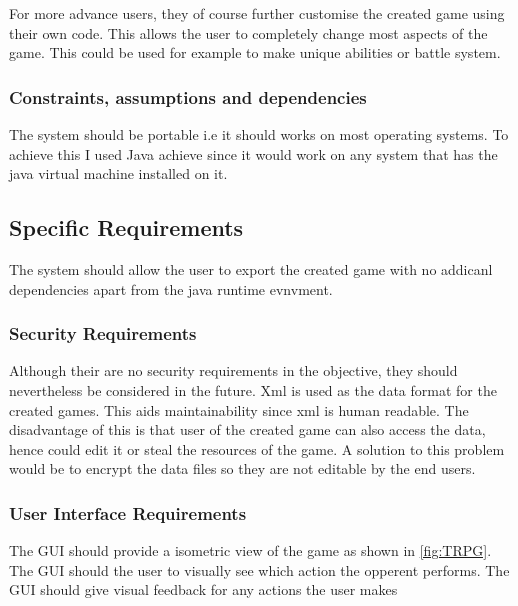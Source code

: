 For more advance users, they of course further customise the created game using their own code. This allows the user to completely change most aspects of the game. This could be used for example to make unique abilities or battle system.


\subsubsection{Constraints, assumptions and dependencies}
The system should be portable i.e it should works on most operating systems.  To achieve this I used Java achieve since it would work on any system that has the java virtual machine installed on it. 



\subsection{Specific Requirements}
The system should allow the user to export the created game with no addicanl dependencies apart from the java runtime evnvment. 

\subsubsection{Security Requirements}
Although their are no security requirements in the objective, they should nevertheless  be considered in the future. Xml is used as the data format for the created games. This aids maintainability since xml is human readable. The disadvantage of this is that user of the created game can also access the data, hence could edit it or steal the resources of the game. A solution to this problem would be to encrypt the data files so they are not editable by the end users.    

\subsubsection{User Interface Requirements}
The GUI should provide a isometric view of the game as shown in \ref{fig:TRPG}. The GUI should the user to visually see which action the opperent performs. The GUI should give visual feedback for any actions the user makes



